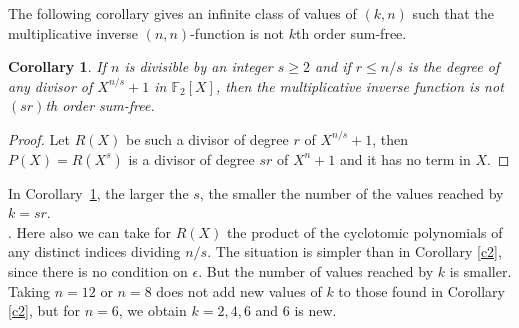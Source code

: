 \documentclass{amsart}
\newtheorem{cor}[thm]{Corollary}
\numberwithin{equation}{section}
\theoremstyle{definition}
\begin{document}
\bigskip

The following corollary gives an infinite class of values of $(k,n)$ such that the multiplicative inverse $(n,n)$-function is not $k$th order sum-free.

\begin{cor}\label{cc3}
If $n$ is divisible by an integer $s\geq 2$ and if $r\leq n/s$ is the degree of any divisor of $X^{n/s}+1$ in $\mathbb F_2[X]$, then  the multiplicative inverse function is not $(sr)$th order sum-free.
\end{cor}

\begin{proof} 
Let $R(X)$ be such a divisor of degree $r$ of $X^{n/s}+1$, then $P(X)=R(X^s)$ is a divisor of degree $sr$ of $X^n+1$ and it has no term in $X$.
\end{proof}

In Corollary~\ref{cc3}, the larger the $s$, the smaller the number of the values reached by $k=sr$.\\

. Here also we can take for $R(X)$ the product of the cyclotomic polynomials of any distinct indices dividing $n/s$. The situation is simpler than in Corollary \ref{c2}, since there is no condition on $\epsilon$. But the number of values reached by $k$ is smaller. Taking $n=12$ or $n=8$ does not add new values of $k$ to those found in Corollary \ref{c2}, but for $n=6$, we obtain $k=2,4,6$ and 6 is new. %

\bigskip
\end{document}
